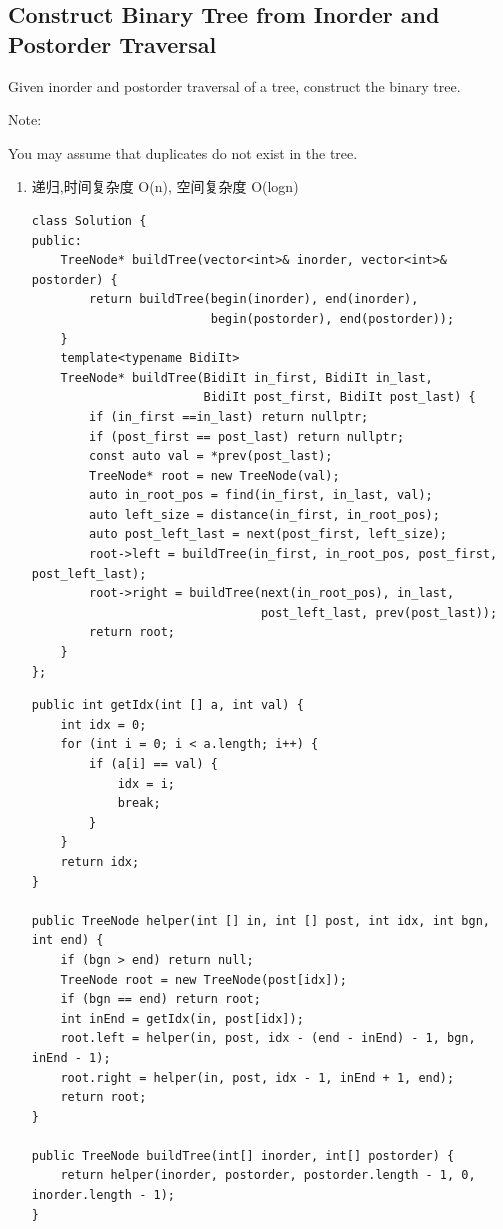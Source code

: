 \documentclass[12pt]{book}
\begin{document}
\subsection{Construct Binary Tree from Inorder and Postorder Traversal}
\label{sec-4-3-2}
Given inorder and postorder traversal of a tree, construct the binary tree.

Note:

You may assume that duplicates do not exist in the tree.

\begin{enumerate}
\item 递归,时间复杂度 O(n), 空间复杂度 O(logn)
\label{sec-4-3-2-1}

\lstset{language=java,label= ,caption= ,numbers=none}
\begin{lstlisting}
class Solution {
public:
    TreeNode* buildTree(vector<int>& inorder, vector<int>& postorder) {
        return buildTree(begin(inorder), end(inorder),
                         begin(postorder), end(postorder));
    }
    template<typename BidiIt>
    TreeNode* buildTree(BidiIt in_first, BidiIt in_last,
                        BidiIt post_first, BidiIt post_last) {
        if (in_first ==in_last) return nullptr;
        if (post_first == post_last) return nullptr;
        const auto val = *prev(post_last);
        TreeNode* root = new TreeNode(val);
        auto in_root_pos = find(in_first, in_last, val);
        auto left_size = distance(in_first, in_root_pos);
        auto post_left_last = next(post_first, left_size);
        root->left = buildTree(in_first, in_root_pos, post_first, post_left_last);
        root->right = buildTree(next(in_root_pos), in_last,
                                post_left_last, prev(post_last));
        return root;
    }
};
\end{lstlisting}

\lstset{language=java,label= ,caption= ,numbers=none}
\begin{lstlisting}
public int getIdx(int [] a, int val) {
    int idx = 0;
    for (int i = 0; i < a.length; i++) {
        if (a[i] == val) {
            idx = i;
            break;
        }
    }
    return idx;
}
        
public TreeNode helper(int [] in, int [] post, int idx, int bgn, int end) {
    if (bgn > end) return null;
    TreeNode root = new TreeNode(post[idx]);
    if (bgn == end) return root;
    int inEnd = getIdx(in, post[idx]);
    root.left = helper(in, post, idx - (end - inEnd) - 1, bgn, inEnd - 1);
    root.right = helper(in, post, idx - 1, inEnd + 1, end);
    return root;
}
        
public TreeNode buildTree(int[] inorder, int[] postorder) {
    return helper(inorder, postorder, postorder.length - 1, 0, inorder.length - 1);
}
\end{lstlisting}
\end{enumerate}
\end{document}
